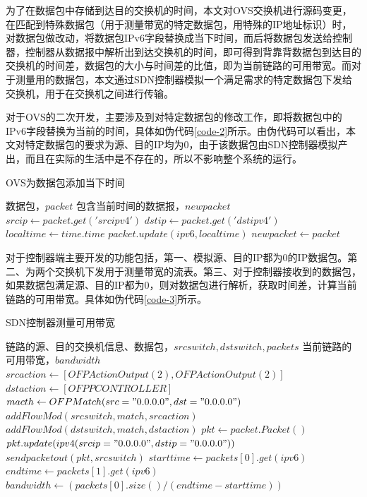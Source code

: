 为了在数据包中存储到达目的交换机的时间，本文对OVS交换机进行源码变更，在匹配到特殊数据包（用于测量带宽的特定数据包，用特殊的IP地址标识）时，对数据包做改动，将数据包IPv6字段替换成当下时间，而后将数据包发送给控制器，控制器从数据报中解析出到达交换机的时间，即可得到背靠背数据包到达目的交换机的时间差，数据包的大小与时间差的比值，即为当前链路的可用带宽。而对于测量用的数据包，本文通过SDN控制器模拟一个满足需求的特定数据包下发给交换机，用于在交换机之间进行传输。

对于OVS的二次开发，主要涉及到对特定数据包的修改工作，即将数据包中的IPv6字段替换为当前的时间，具体如伪代码\ref{code-2}所示。由伪代码可以看出，本文对特定数据包的要求为源、目的IP均为0，由于该数据包由SDN控制器模拟产出，而且在实际的生活中是不存在的，所以不影响整个系统的运行。

\begin{algorithm}[!htb]
    \caption{OVS为数据包添加当下时间}
    \label{code-2}
    \begin{algorithmic}[1] %
        \Require 数据包，$packet$
        \Ensure 包含当前时间的数据报，$newpacket$
        	\State $srcip \gets packet.get('srcipv4')$
        	\State $dstip \gets packet.get('dstipv4')$
        		\State $localtime \gets time.time$
        		\State $packet.update(ipv6, localtime)$
        	\EndIf
      		\State $newpacket \gets packet$
      		\State {}
        \EndFunction
    \end{algorithmic}
\end{algorithm}

对于控制器端主要开发的功能包括，第一、模拟源、目的IP都为0的IP数据包。第二、为两个交换机下发用于测量带宽的流表。第三、对于控制器接收到的数据包，如果数据包满足源、目的IP都为0，则对数据包进行解析，获取时间差，计算当前链路的可用带宽。具体如伪代码\ref{code-3}所示。

\begin{algorithm}[!htb]
    \caption{SDN控制器测量可用带宽}
    \label{code-3}
    \begin{algorithmic}[1] %
        \Require 链路的源、目的交换机信息、数据包，$srcswitch,dstswitch,packets$
        \Ensure 当前链路的可用带宽，$bandwidth$
        	\State $srcaction \gets [OFPActionOutput(2),OFPActionOutput(2)]$
        	\State $dstaction \gets [OFPPCONTROLLER]$
        	\State $macth \gets OFPMatch(src="0.0.0.0",dst="0.0.0.0")$
        	\State $addFlowMod(srcswitch,match,srcaction)$
        	\State $addFlowMod(dstswitch,match,dstaction)$
        \EndFunction
        	\State $pkt \gets packet.Packet()$
        	\State $pkt.update(ipv4(srcip="0.0.0.0",dstip="0.0.0.0"))$
        	\State $sendpacketout(pkt, srcswitch)$
        \EndFunction
         	\State $starttime \gets packets[0].get(ipv6)$
         	\State $endtime \gets packets[1].get(ipv6)$
         	\State $bandwidth \gets (packets[0].size()/(endtime-starttime))$
         	\State {}
        \EndFunction
    \end{algorithmic}
\end{algorithm}
